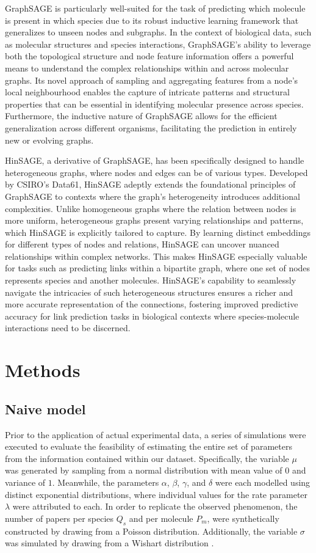 \documentclass[
11pt, %
oneside, %
english, %
singlespacing, %
headsepline, %
chapterinoneline, %
]{MastersDoctoralThesis} %
\begin{document}
GraphSAGE is particularly well-suited for the task of predicting which molecule is present in which species due to its robust inductive learning framework that generalizes to unseen nodes and subgraphs. In the context of biological data, such as molecular structures and species interactions, GraphSAGE's ability to leverage both the topological structure and node feature information offers a powerful means to understand the complex relationships within and across molecular graphs. Its novel approach of sampling and aggregating features from a node's local neighbourhood enables the capture of intricate patterns and structural properties that can be essential in identifying molecular presence across species. Furthermore, the inductive nature of GraphSAGE allows for the efficient generalization across different organisms, facilitating the prediction in entirely new or evolving graphs.

HinSAGE, a derivative of GraphSAGE, has been specifically designed to handle heterogeneous graphs, where nodes and edges can be of various types. Developed by CSIRO's Data61, HinSAGE adeptly extends the foundational principles of GraphSAGE to contexts where the graph's heterogeneity introduces additional complexities. Unlike homogeneous graphs where the relation between nodes is more uniform, heterogeneous graphs present varying relationships and patterns, which HinSAGE is explicitly tailored to capture. By learning distinct embeddings for different types of nodes and relations, HinSAGE can uncover nuanced relationships within complex networks. This makes HinSAGE especially valuable for tasks such as predicting links within a bipartite graph, where one set of nodes represents species and another molecules. HinSAGE's capability to seamlessly navigate the intricacies of such heterogeneous structures ensures a richer and more accurate representation of the connections, fostering improved predictive accuracy for link prediction tasks in biological contexts where species-molecule interactions need to be discerned.

\chapter{Methods}\label{chap:Methods}
\section{Naive model}
Prior to the application of actual experimental data, a series of simulations were executed to evaluate the feasibility of estimating the entire set of parameters from the information contained within our dataset. Specifically, the variable $\mu$ was generated by sampling from a normal distribution with mean value of $0$ and variance of $1$. Meanwhile, the parameters $\alpha$, $\beta$, $\gamma$, and $\delta$ were each modelled using distinct exponential distributions, where individual values for the rate parameter $\lambda$ were attributed to each. In order to replicate the observed phenomenon, the number of papers per species $Q_s$ and per molecule $P_m$, were synthetically constructed by drawing from a Poisson distribution. Additionally, the variable $\sigma$ was simulated by drawing from a Wishart distribution \cite{wishartGENERALISEDPRODUCTMOMENT1928}.
\end{document}
